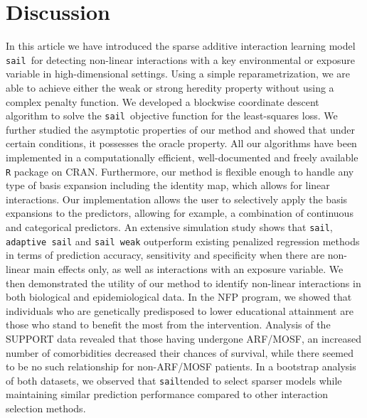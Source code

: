 \documentclass[a4paper,fleqn]{cas-sc}
\newcommand{\sail}{\texttt{sail}}
\begin{document}



\section{Discussion} \label{sec:sail_discussion}

In this article we have introduced the sparse additive interaction learning model \sail ~for detecting non-linear interactions with a key environmental or exposure variable in high-dimensional settings.
Using a simple reparametrization, we are able to achieve either the weak or strong heredity property without using a complex penalty function. 
We developed a blockwise coordinate descent algorithm to solve the \sail ~objective function  for the least-squares loss.
We further studied the asymptotic properties of our method and showed that under certain conditions, it possesses the oracle property.
All our algorithms have been implemented in a computationally efficient, well-documented and freely available \texttt{R} package on CRAN.
Furthermore, our method is flexible enough to handle any type of basis expansion including the identity map, which allows for linear interactions.
Our implementation allows the user to selectively apply the basis expansions to the predictors, allowing for example, a combination of continuous and categorical predictors.
An extensive simulation study shows that \sail, \texttt{adaptive sail} and \texttt{sail weak} outperform existing penalized regression methods in terms of prediction accuracy, sensitivity and specificity when there are non-linear main effects only, as well as interactions with an exposure variable.
We then demonstrated the utility of our method to identify non-linear interactions in both biological and epidemiological data. 
In the NFP program, we showed that individuals who are genetically predisposed to lower educational attainment are those who stand to benefit the most from the intervention. 
Analysis of the SUPPORT data revealed that those having undergone ARF/MOSF, an increased number of comorbidities decreased their chances of survival, while there seemed to be no such relationship for non-ARF/MOSF patients. 
In a bootstrap analysis of both datasets, we observed that \sail tended to select sparser models while maintaining similar prediction performance compared to other interaction selection methods. 
\end{document}
